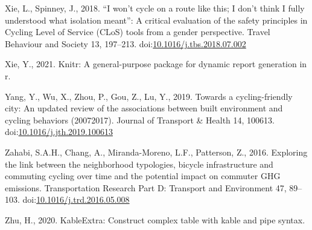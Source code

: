 \documentclass[]{elsarticle} %
\begin{document}
\leavevmode\hypertarget{ref-xieWonCycleRoute2018}{}%
Xie, L., Spinney, J., 2018. ``I won't cycle on a route like this; I
don't think I fully understood what isolation meant'': A critical
evaluation of the safety principles in Cycling Level of Service (CLoS)
tools from a gender perspective. Travel Behaviour and Society 13,
197--213.
doi:\href{https://doi.org/10.1016/j.tbs.2018.07.002}{10.1016/j.tbs.2018.07.002}

\leavevmode\hypertarget{ref-R-knitr}{}%
Xie, Y., 2021. Knitr: A general-purpose package for dynamic report
generation in r.

\leavevmode\hypertarget{ref-yangCyclingfriendlyCityUpdated2019}{}%
Yang, Y., Wu, X., Zhou, P., Gou, Z., Lu, Y., 2019. Towards a
cycling-friendly city: An updated review of the associations between
built environment and cycling behaviors (20072017). Journal of Transport
\& Health 14, 100613.
doi:\href{https://doi.org/10.1016/j.jth.2019.100613}{10.1016/j.jth.2019.100613}

\leavevmode\hypertarget{ref-zahabiExploringLinkNeighborhood2016b}{}%
Zahabi, S.A.H., Chang, A., Miranda-Moreno, L.F., Patterson, Z., 2016.
Exploring the link between the neighborhood typologies, bicycle
infrastructure and commuting cycling over time and the potential impact
on commuter GHG emissions. Transportation Research Part D: Transport and
Environment 47, 89--103.
doi:\href{https://doi.org/10.1016/j.trd.2016.05.008}{10.1016/j.trd.2016.05.008}

\leavevmode\hypertarget{ref-R-kableExtra}{}%
Zhu, H., 2020. KableExtra: Construct complex table with kable and pipe
syntax.
\end{document}
